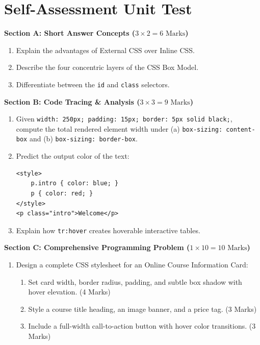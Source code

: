 \section{Self-Assessment Unit Test}

\begin{chaptertest}
\noindent\textbf{Section A: Short Answer Concepts ($3 \times 2 = 6\text{ Marks}$)}
\begin{enumerate}
    \item Explain the advantages of External CSS over Inline CSS.
    \item Describe the four concentric layers of the CSS Box Model.
    \item Differentiate between the \texttt{id} and \texttt{class} selectors.
\end{enumerate}

\medskip
\noindent\textbf{Section B: Code Tracing \& Analysis ($3 \times 3 = 9\text{ Marks}$)}
\begin{enumerate}[start=4]
    \item Given \texttt{width: 250px; padding: 15px; border: 5px solid black;}, compute the total rendered element width under (a) \texttt{box-sizing: content-box} and (b) \texttt{box-sizing: border-box}.
    \item Predict the output color of the text:
    \begin{lstlisting}[language=HTML5]
<style>
    p.intro { color: blue; }
    p { color: red; }
</style>
<p class="intro">Welcome</p>
    \end{lstlisting}
    \item Explain how \texttt{tr:hover} creates hoverable interactive tables.
\end{enumerate}

\medskip
\noindent\textbf{Section C: Comprehensive Programming Problem ($1 \times 10 = 10\text{ Marks}$)}
\begin{enumerate}[start=7]
    \item Design a complete CSS stylesheet for an Online Course Information Card:
    \begin{enumerate}[label=(\alph*)]
        \item Set card width, border radius, padding, and subtle box shadow with hover elevation. (4 Marks)
        \item Style a course title heading, an image banner, and a price tag. (3 Marks)
        \item Include a full-width call-to-action button with hover color transitions. (3 Marks)
    \end{enumerate}
\end{enumerate}
\end{chaptertest}

